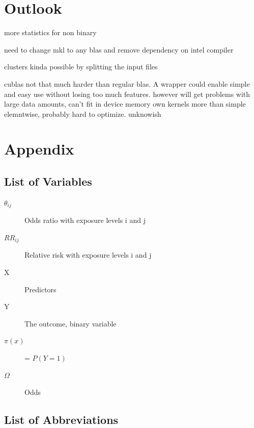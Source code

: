 \documentclass[10pt,a4paper]{report}
\begin{document}
\chapter{Outlook}
more statistics for non binary

need to change mkl to any blas and remove dependency on intel compiler

clusters
kinda possible by splitting the input files

cublas not that much harder than regular blas. A wrapper could enable simple and easy use without losing too much features.
however will get problems with large data amounts, can't fit in device memory
own kernels more than simple elemntwise, probably hard to optimize. unknowish

\chapter{Appendix}
\section{List of Variables}

\begin{description}
\item[$\theta_{ij}$]
  Odds ratio with exposure levels i and j
\item[$RR_{ij}$]
  Relative risk with exposure levels i and j
\item[X]
  Predictors
\item[Y]
  The outcome, binary variable
\item[$\pi(x)$]
  = $P(Y=1)$
\item[$\Omega$]
  Odds
\end{description}

\section{List of Abbreviations}
\end{document}
